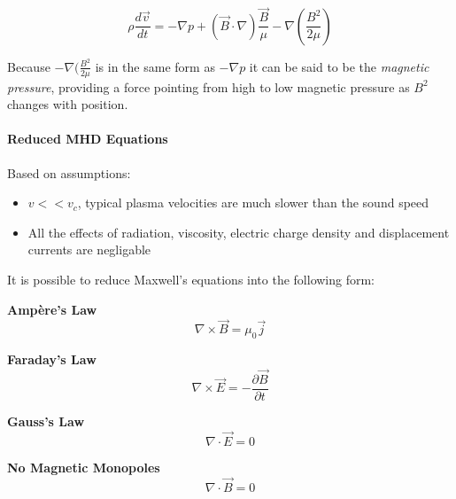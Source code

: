 \begin{equation}\label{maghydstat}
\rho\frac{d\vec{v}}{dt}= -\nabla p + (\vec{B}\cdot\nabla)\frac{\vec{B}}{\mu}-\nabla(\frac{B^2}{2\mu}) 
\end{equation}

Because $-\nabla(\frac{B^2}{2\mu}$ is in the same form as $-\nabla p$ it can be said to be the \emph{magnetic pressure}, providing a force pointing from high to low magnetic pressure as $B^2$ changes with position.

\paragraph{Reduced MHD Equations}
Based on assumptions:
\begin{itemize}
\item $v<<v_{c}$, typical plasma velocities are much slower than the sound speed 
\item All the effects of radiation, viscosity, electric charge density and displacement currents are negligable 
\end{itemize}
It is possible to reduce Maxwell's equations into the following form:

\textbf{Ampère's Law}
\begin{equation}\label{max1:ampere}
\nabla\times\vec{B}=\mu_{0}\vec{j}
\end{equation}

\textbf{Faraday's Law}
\begin{equation}\label{max2:faraday}
\nabla\times\vec{E}=-\frac{\partial \vec{B}}{\partial t}
\end{equation}

\textbf{Gauss's Law}
\begin{equation}\label{max3:gauss}
\nabla\cdot\vec{E}=0
\end{equation}

\textbf{No Magnetic Monopoles}
\begin{equation}\label{max4:nomonopole}
\nabla\cdot\vec{B}=0
\end{equation}
